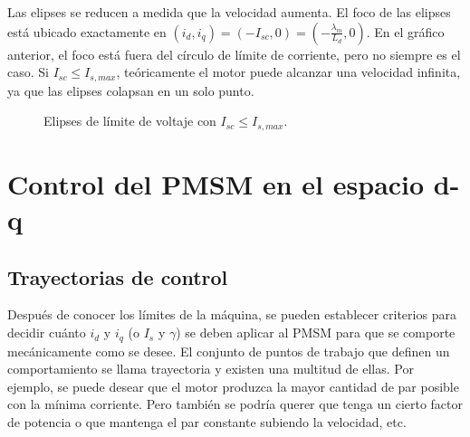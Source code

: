 Las elipses se reducen a medida que la velocidad aumenta. El foco de las elipses está ubicado exactamente en \((i_d, i_q)=(-I_{sc}, 0) = \left(-\frac{\lambda_m}{L_d},0\right)\). En el gráfico anterior, el foco está fuera del círculo de límite de corriente, pero no siempre es el caso. Si \(I_{sc} \leq I_{s,max}\), teóricamente el motor puede alcanzar una velocidad infinita, ya que las elipses colapsan en un solo punto. 



\begin{figure}[H]
  \centering
  \caption{Elipses de límite de voltaje con $I_{sc} \leq I_{s,max}$.}
\end{figure}





\section{Control del PMSM en el espacio d-q}
\subsection{Trayectorias de control}

Después de conocer los límites de la máquina, se pueden establecer criterios para decidir cuánto \(i_d\) y \(i_q\) (o \(I_s\) y \(\gamma\)) se deben aplicar al PMSM para que se comporte mecánicamente como se desee. El conjunto de puntos de trabajo que definen un comportamiento se llama trayectoria y existen una multitud de ellas. Por ejemplo, se puede desear que el motor produzca la mayor cantidad de par posible con la mínima corriente. Pero también se podría querer que tenga un cierto factor de potencia o que mantenga el par constante subiendo la velocidad, etc.

